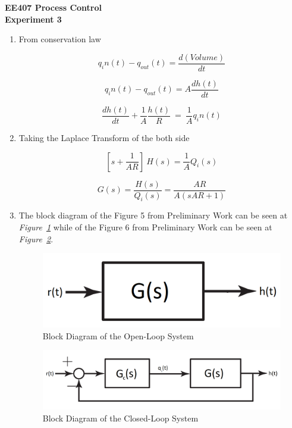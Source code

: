 \documentclass[a4paper,12pt]{article}
\begin{document}
\begin{center}
	\textbf{\large EE407 Process Control \\[0.2cm] Experiment 3} \\
\end{center}


	\begin{enumerate}
		\item From conservation law
			
			$$ q_in(t)-q_{out}(t)=\frac{d(Volume)}{dt} $$
			
			$$ q_in(t)-q_{out}(t)=A \frac{dh(t)}{dt} $$
			
			$$\boxed{ \frac{dh(t)}{dt}+ \frac{1}{A}\frac{h(t)}{R}\ =\ \frac{1}{A} q_in(t) }$$
		
		
		\item Taking the Laplace Transform of the both side
		
			$$ [s+\frac{1}{AR}]\ H(s)=\frac{1}{A}Q_i(s) $$

			$$\boxed{ G(s)=\frac{H(s)}{Q_i(s)}=\frac{AR}{A(sAR+1)} }$$		
		
		\item The block diagram of the Figure 5 from Preliminary Work can be seen at \textit{Figure~\ref{fig:block}} while of the Figure 6 from Preliminary Work can be seen at \textit{Figure~\ref{fig:withcontr}}.
		
			\begin{figure}[H]
				\center
				\setlength{\unitlength}{\textwidth} 
				\includegraphics[width=0.5\unitlength]{images/block}
				\caption{\label{fig:block} Block Diagram of the Open-Loop System }
			\end{figure}
				
			\begin{figure}[H]
				\center
				\setlength{\unitlength}{\textwidth} 
				\includegraphics[width=0.8\unitlength]{images/withcontr}
				\caption{\label{fig:withcontr} Block Diagram of the Closed-Loop System }
			\end{figure}
		

\end{enumerate}
\end{document}

